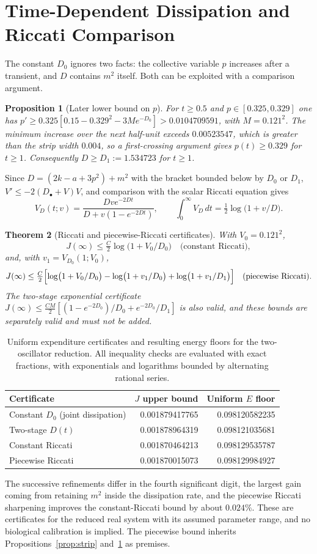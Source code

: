 \documentclass[11pt,notitlepage]{report}
\newtheorem{theorem}{Theorem}[chapter]
\newtheorem{proposition}[theorem]{Proposition}
\theoremstyle{definition}
\theoremstyle{remark}
\begin{document}
\section{Time-Dependent Dissipation and Riccati Comparison}
The constant $D_0$ ignores two facts: the collective variable $p$ increases after a transient, and $D$ contains $m^2$ itself. Both can be exploited with a comparison argument.
\begin{proposition}[Later lower bound on $p$]\label{prop:laterp}
For $t\ge0.5$ and $p\in[0.325,0.329]$ one has $p'\ge0.325[0.15-0.329^2-3M e^{-D_0}]>0.0104709591$, with $M=0.121^2$. The minimum increase over the next half-unit exceeds $0.00523547$, which is greater than the strip width $0.004$, so a first-crossing argument gives $p(t)\ge0.329$ for $t\ge1$. Consequently $D\ge D_1:=1.534723$ for $t\ge1$.
\end{proposition}
Since $D=(2k-a+3p^2)+m^2$ with the bracket bounded below by $D_0$ or $D_1$, $V'\le-2(D_\bullet+V)V$, and comparison with the scalar Riccati equation gives
\[
V_D(t;v)=\frac{Dve^{-2Dt}}{D+v(1-e^{-2Dt})},\qquad\int_0^\infty V_D\,dt=\tfrac12\log\bigl(1+v/D\bigr).
\]
\begin{theorem}[Riccati and piecewise-Riccati certificates]\label{th:riccati}
With $V_0=0.121^2$,
\[
J(\infty)\le\tfrac C2\log\bigl(1+V_0/D_0\bigr)\quad\text{(constant Riccati)},
\]
and, with $v_1=V_{D_0}(1;V_0)$,
\[
J(\infty)\le\tfrac C2\Bigl[\log\bigl(1+V_0/D_0\bigr)-\log\bigl(1+v_1/D_0\bigr)+\log\bigl(1+v_1/D_1\bigr)\Bigr]\quad\text{(piecewise Riccati)}.
\]
The two-stage exponential certificate $J(\infty)\le\tfrac{CM}2[(1-e^{-2D_0})/D_0+e^{-2D_0}/D_1]$ is also valid, and these bounds are separately valid and must not be added.
\end{theorem}
\begin{table}[ht]\centering\small
\caption{Uniform expenditure certificates and resulting energy floors for the two-oscillator reduction. All inequality checks are evaluated with exact fractions, with exponentials and logarithms bounded by alternating rational series.}
\begin{tabular}{lrr}\toprule
Certificate&$J$ upper bound&Uniform $E$ floor\\\midrule
Constant $D_0$ (joint dissipation)&0.001879417765&0.098120582235\\
Two-stage $D(t)$&0.001878964319&0.098121035681\\
Constant Riccati&0.001870464213&0.098129535787\\
Piecewise Riccati&0.001870015073&0.098129984927\\\bottomrule
\end{tabular}
\end{table}
The successive refinements differ in the fourth significant digit, the largest gain coming from retaining $m^2$ inside the dissipation rate, and the piecewise Riccati sharpening improves the constant-Riccati bound by about $0.024\%$. These are certificates for the reduced real system with its assumed parameter range, and no biological calibration is implied. The piecewise bound inherits Propositions~\ref{prop:strip} and~\ref{prop:laterp} as premises.
\end{document}
